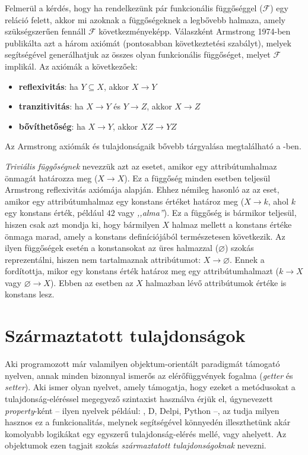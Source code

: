 Felmerül a kérdés, hogy ha rendelkezünk pár funkcionális függőséggel ($\mathcal F$) egy reláció felett, akkor mi azoknak a függőségeknek a legbővebb halmaza, amely szükségszerűen fennáll $\mathcal F$ következményeképp.
Válaszként Armstrong 1974-ben publikálta azt a három axiómát (pontosabban következtetési szabályt), melyek segítségével generálhatjuk az összes olyan funkcionális függőséget, melyet $\mathcal F$ implikál.
Az axiómák a következőek:
\begin{itemize}
    \item \textbf{reflexivitás}: ha $Y \subseteq X$, akkor $X \rightarrow Y$
    \item \textbf{tranzitivitás}: ha $X \rightarrow Y$ és $Y \rightarrow Z$, akkor $X \rightarrow Z$
    \item \textbf{bővíthetőség}: ha $X \rightarrow Y$, akkor $XZ \rightarrow YZ$
\end{itemize}
Az Armstrong axiómák és tulajdonságaik bővebb tárgyalása megtalálható a \cite{Gajdos06}-ben.

\emph{Triviális függőségnek} nevezzük azt az esetet, amikor egy attribútumhalmaz önmagát határozza meg ($X \rightarrow X$).
Ez a függőség minden esetben teljesül Armstrong reflexivitás axiómája alapján.
Ehhez némileg hasonló az az eset, amikor egy attribútumhalmaz egy konstans értéket határoz meg ($X \rightarrow k$, ahol $k$ egy konstans érték, például $42$ vagy \textit{,,alma''}).
Ez a függőség is bármikor teljesül, hiszen csak azt mondja ki, hogy bármilyen $X$ halmaz mellett a konstans értéke önmaga marad, amely a konstans definíciójából természetesen következik.
Az ilyen függőségek esetén a konstansokat az üres halmazzal ($\varnothing$) szokás reprezentálni, hiszen nem tartalmaznak attribútumot: $X \rightarrow \varnothing$.
Ennek a fordítottja, mikor egy konstans érték határoz meg egy attribútumhalmazt ($k \rightarrow X$ vagy $\varnothing \rightarrow X$).
Ebben az esetben az $X$ halmazban lévő attribútumok értéke is konstans lesz.

\section{Származtatott tulajdonságok}

Aki programozott már valamilyen objektum-orientált paradigmát támogató nyelven, annak minden bizonnyal ismerős az elérőfüggvények fogalma (\emph{getter} és \emph{setter}).
Aki ismer olyan nyelvet, amely támogatja, hogy ezeket a metódusokat a tulajdonság-eléréssel megegyező szintaxist használva érjük el, úgynevezett \emph{property}-ként -- ilyen nyelvek például: \CSharp, D, Delpi, Python --, az tudja milyen hasznos ez a funkcionalitás, melynek segítségével könnyedén illeszthetünk akár komolyabb logikákat egy egyszerű tulajdonság-elérés mellé, vagy ahelyett.
Az objektumok ezen tagjait szokás \emph{származtatott tulajdonságoknak} nevezni.

